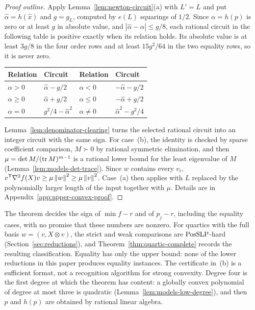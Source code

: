 \begin{proof}[Proof outline]
Apply Lemma~\ref{lem:newton-circuit}(a) with $L'=L$ and put
$\hat\alpha=h(\hat x)$ and $g=g_L$, computed by $e(L)$ squarings of $1/2$.
Since $\alpha=h(p)$ is zero or at least $g$ in absolute value, and
$|\hat\alpha-\alpha|\le g/8$, each rational circuit in the following table
is positive exactly when its relation holds. Its absolute value is at least
$3g/8$ in the four order rows and at least $15g^2/64$ in the two equality
rows, so it is never zero.
\begin{center}
\begin{tabular}{ll@{\qquad}ll}
\toprule
Relation & Circuit & Relation & Circuit\\
\midrule
$\alpha>0$ & $\hat\alpha-g/2$ & $\alpha<0$ & $-\hat\alpha-g/2$\\
$\alpha\ge0$ & $\hat\alpha+g/2$ & $\alpha\le0$ & $-\hat\alpha+g/2$\\
$\alpha=0$ & $g^2/4-\hat\alpha^2$ & $\alpha\ne0$ & $\hat\alpha^2-g^2/4$\\
\bottomrule
\end{tabular}
\end{center}
Lemma~\ref{lem:denominator-clearing} turns the selected rational circuit into
an integer circuit with the same sign. For case~(b), the identity is checked
by sparse coefficient comparison, $M\succ0$ by rational symmetric
elimination, and then $\mu=\det M/(\operatorname{tr} M)^{m-1}$ is a rational lower bound
for the least eigenvalue of $M$ (Lemma~\ref{lem:models-det-trace}). Since $w$
contains every $v_i$, $v^{\mathsf T}\nabla^2f(X)v\ge\mu\left\lVert w\right\rVert^2\ge\mu\left\lVert v\right\rVert^2$.
Case~(a) then applies with $L$ replaced by the polynomially larger length of
the input together with $\mu$. Details are in
Appendix~\ref{app:upper-convex-proof}.
\end{proof}

The theorem decides the sign of $\min f-r$ and of $p_j-r$, including the
equality cases, with no promise that these numbers are nonzero. For quartics
with the full basis $w=(v,X\otimes v)$, the strict and weak comparisons are
$\mathrm{PosSLP}$-hard (Section~\ref{sec:reductions}), and
Theorem~\ref{thm:quartic-complete} records the resulting classification.
Equality has only the upper bound: none of the lower reductions in this paper
produces equality instances. The certificate in~(b) is a sufficient format,
not a recognition algorithm for strong convexity. Degree four is the first
degree at which the theorem has content: a globally convex polynomial of
degree at most three is quadratic (Lemma~\ref{lem:models-low-degree}), and
then $p$ and $h(p)$ are obtained by rational linear algebra.

